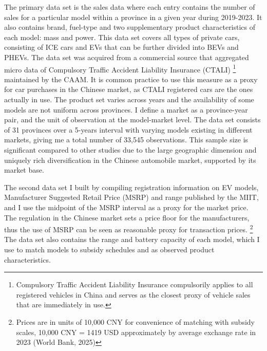 \documentclass[12pt]{article}
\begin{document}
The primary data set is the sales data where each entry contains the number of sales for a particular model within a province in a given year during 2019-2023.
It also contains brand, fuel-type and two supplementary product characteristics of each model: mass and power. 
This data set covers all types of private cars, consisting of ICE cars and EVs that can be further divided into BEVs and PHEVs. 
The data set was acquired from a commercial source that aggregated micro data of Compulsory Traffic Accident Liability Insurance (CTALI)
\footnote{Compulsory Traffic Accident Liability Insurance compulsorily applies to all registered vehicles in China and serves as the closest proxy of vehicle sales that are immediately in use.} 
maintained by the CAAM. It is common practice to use this measure as a proxy for car purchases in the Chinese market, as CTALI registered cars are the ones actually in use. 
The product set varies across years and the availability of some models are not uniform across provinces. 
I define a market as a province-year pair, and the unit of observation at the model-market level.
The data set consists of 31 provinces over a 5-years interval with varying models existing in different markets, giving me a total number of 33,545 observations. 
This sample size is significant compared to other studies due to the large geographic dimension and uniquely rich diversification in the Chinese automobile market, supported by its market base.

The second data set I built by compiling registration information on EV models, Manufacturer Suggested Retail Price (MSRP) and range published by the MIIT, 
and I use the midpoint of the MSRP interval as a proxy for the market price. The regulation in the Chinese market sets a price floor for the manufacturers, 
thus the use of MSRP can be seen as reasonable proxy for transaction prices. \footnote{Prices are in units of 10,000 CNY for convenience of matching with subsidy scales, 10,000 CNY = 1419 USD approximately by average exchange rate in 2023 (World Bank, 2025)}
The data set also contains the range and battery capacity of each model, which I use to match models to subsidy schedules and as observed product characteristics.
\end{document}
